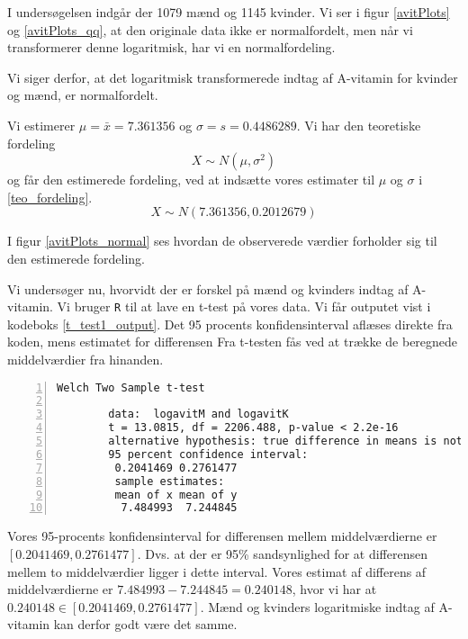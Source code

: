 I undersøgelsen indgår der 1079 mænd og 1145 kvinder. Vi ser i figur
\ref{avitPlots} og \ref{avitPlots_qq}, at den originale data ikke er
normalfordelt, men når vi transformerer denne logaritmisk, har vi en
normalfordeling.

Vi siger derfor, at det logaritmisk transformerede indtag af A-vitamin for
kvinder og mænd, er normalfordelt.

Vi estimerer $\mu = \bar{x} = 7.361356$ og $\sigma = s = 0.4486289$. Vi har den teoretiske fordeling
\begin{equation}
    X\sim N(\mu, \sigma^2)
    \label{teo_fordeling}
\end{equation}
og får den estimerede fordeling, ved at indsætte vores estimater til $\mu$ og
$\sigma$ i \eqref{teo_fordeling}.
\begin{equation}
    X\sim N(7.361356, 0.2012679)
\end{equation}

I figur \ref{avitPlots_normal} ses hvordan de observerede værdier forholder sig
til den estimerede fordeling.

Vi undersøger nu, hvorvidt der er forskel på mænd og kvinders indtag af
A-vitamin.  Vi bruger \texttt{R} til at lave en t-test på vores data. Vi får
outputet vist i kodeboks \ref{t_test1_output}. Det 95 procents
konfidensinterval aflæses direkte fra koden, mens estimatet for differensen
Fra t-testen fås ved at trække de beregnede middelværdier fra hinanden.

\begin{lstlisting}[caption={Udskrift fra T-test},captionpos=b,label={t_test1_output},numbers=left,
    frame=tb, breaklines=false, float=h]
        Welch Two Sample t-test

        data:  logavitM and logavitK
        t = 13.0815, df = 2206.488, p-value < 2.2e-16
        alternative hypothesis: true difference in means is not equal to 0 
        95 percent confidence interval:
         0.2041469 0.2761477
         sample estimates:
         mean of x mean of y
          7.484993  7.244845
\end{lstlisting}

Vores 95-procents konfidensinterval for differensen mellem middelværdierne er
$[0.2041469, 0.2761477]$. Dvs. at der er 95\% sandsynlighed for at differensen
mellem to middelværdier ligger i dette interval.  Vores estimat af differens af
middelværdierne er $7.484993-7.244845 = 0.240148$, hvor vi har at $0.240148 \in
[0.2041469, 0.2761477]$. Mænd og kvinders logaritmiske indtag af A-vitamin kan
derfor godt være det samme.

